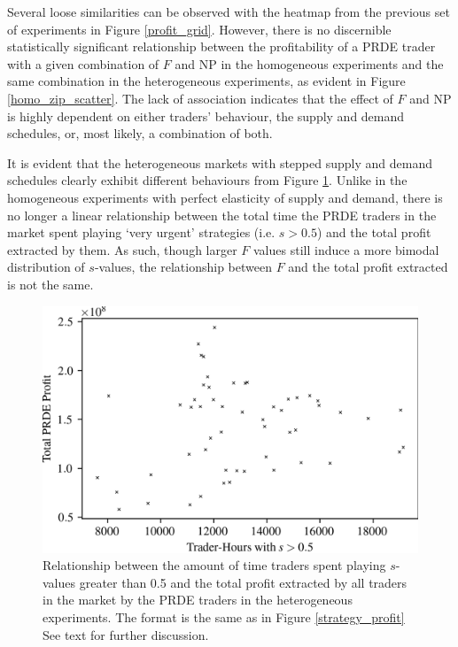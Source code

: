 \documentclass[conference]{IEEEtran}
\begin{document}
Several loose similarities can be observed with the heatmap from the previous set of experiments in Figure \ref{profit_grid}.
However, there is no discernible statistically significant relationship between the profitability of a PRDE trader with a given combination of $F$ and $\mathrm{NP}$ in the homogeneous experiments and the same combination in the heterogeneous experiments, as evident in Figure \ref{homo_zip_scatter}.
The lack of association indicates that the effect of $F$ and $\mathrm{NP}$ is highly dependent on either traders' behaviour, the supply and demand schedules, or, most likely, a combination of both.

It is evident that the heterogeneous markets with stepped supply and demand schedules clearly exhibit different behaviours from Figure \ref{ZIP_strategy_profit}.
Unlike in the homogeneous experiments with perfect elasticity of supply and demand, there is no longer a linear relationship between the total time the PRDE traders in the market spent playing `very urgent' strategies (i.e. $s>0.5$) and the total profit extracted by them.
As such, though larger $F$ values still induce a more bimodal distribution of $s$-values, the relationship between $F$ and the total profit extracted is not the same.

\begin{figure}[htbp]
    \centerline{\includegraphics[width=\columnwidth]{ZIP_strategy_profit.png}}
    \caption{
        Relationship between the amount of time traders spent playing $s$-values greater than 0.5 and the total profit extracted by all traders in the market by the PRDE traders in the heterogeneous experiments.
        The format is the same as in Figure \ref{strategy_profit}
        See text for further discussion.
    }
    \label{ZIP_strategy_profit}
\end{figure}
\end{document}

